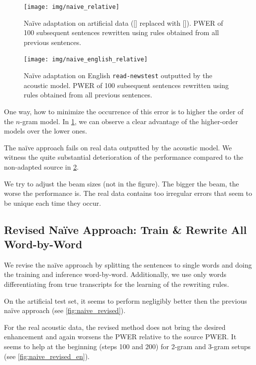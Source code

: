 \begin{figure}[h]
    \texttt{[image: img/naive\_relative]}
    \caption{Na\"ive adaptation on artificial data ([] replaced with []). PWER of 100 subsequent sentences rewritten using rules obtained from all previous sentences.}
    \label{fig:naive} 
\end{figure}

\begin{figure}[h]
    \texttt{[image: img/naive\_english\_relative]}
    \caption{Na\"ive adaptation on English \texttt{read-newstest} outputted by the acoustic model. PWER of 100 subsequent sentences rewritten using rules obtained from all previous sentences.}
    \label{fig:naive_en} 
\end{figure}

One way, how to minimize the occurrence of this error is to higher the order of the $n$-gram model. In \cref{fig:naive}, we can observe a clear advantage of the higher-order models over the lower ones.

The na\"ive approach fails on real data outputted by the acoustic model. We witness the quite substantial deterioration of the performance compared to the non-adapted source in \cref{fig:naive_en}. 

We try to adjust the beam sizes (not in the figure). The bigger the beam, the worse the performance is. The real data contains too irregular errors that seem to be unique each time they occur.

\subsection[Revised Na\"ive Approach: Train \& Rewrite All Word-by-Word]{Revised Na\"ive Approach: Train \& Rewrite All \\Word-by-Word}
We revise the na\"ive approach by splitting the sentences to single words and doing the training and inference word-by-word. Additionally, we use only words differentiating from true transcripts for the learning of the rewriting rules. 

On the artificial test set, it seems to perform negligibly better then the previous na\"ive approach (see \cref{fig:naive_revised}).

For the real acoustic data, the revised method does not bring the desired enhancement and again worsens the PWER relative to the source PWER. It seems to help at the beginning (steps 100 and 200) for 2-gram and 3-gram setups (see \cref{fig:naive_revised_en}). 

